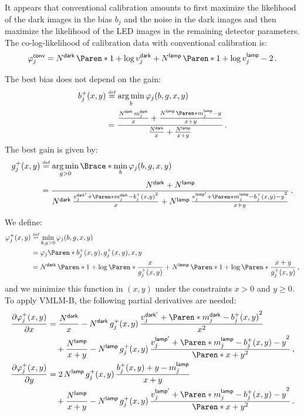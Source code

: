 \documentclass[a4paper,11pt,twoside]{scrartcl}
\DeclareMathOperator*{\argmin}{arg\,min}
\newcommand*{\Tag}[1]{\mathsf{#1}}
\newcommand*{\PDer}[2]{\frac{\partial#1}{\partial#2}}
\newcommand*{\bydef}{\stackrel{{\scriptscriptstyle \text{def}}}{=}}
\theoremstyle{plain} %
\theoremstyle{definition}
\theoremstyle{remark}
\begin{document}
It appears that conventional calibration amounts to first maximize the
likelihood of the dark images in the bias $b_j$ and the noise in the dark
images and then maximize the likelihood of the LED images in the remaining
detector parameters.  The co-log-likelihood of calibration data with
conventional calibration is:
\begin{align}
  \varphi^\Tag{conv}_j =
  N^\Tag{dark}\,\Paren*{1 + \log v^\Tag{dark}_j} +
  N^\Tag{lamp}\,\Paren*{1 + \log v^\Tag{lamp}_j} - 2 \, .
\end{align}

The best bias does not depend on the gain:
\begin{align}
  b^+_j(x,y)
  &\bydef \argmin_{b} \varphi_j(b,g,x,y) \notag\\
  &= \frac{
    \frac{N^\Tag{dark}\,m^\Tag{dark}_j}{x} +
    \frac{N^\Tag{lamp}\,\Paren*{m^\Tag{lamp}_j - y}}{x + y}
  }{
    \frac{N^\Tag{dark}}{x} +
    \frac{N^\Tag{lamp}}{x + y}
  } \, .
\end{align}
The best gain is given by:
\begin{align}
  g^+_j(x,y)
  &\bydef \argmin_{g > 0} \Brace*{\min_{b} \varphi_j(b,g,x,y)} \notag\\
  &= \frac{
    N^\Tag{dark} + N^\Tag{lamp}
  }{
    N^\Tag{dark}\,\frac{
      v^\Tag{dark'}_j + \Paren*{m^\Tag{dark}_j - b^+_j(x,y)}^2
    }{
      x
    } + N^\Tag{lamp}\,\frac{
      v^\Tag{lamp'}_j + \Paren*{m^\Tag{lamp}_j - b^+_j(x,y) - y}^2
    }{
      x + y
    }
  } \, .
\end{align}

We define:
\begin{align}
  \varphi^+_j(x, y)
  &\bydef \min_{b,g>0} \varphi_j(b,g,x,y) \notag \\
  &= \varphi_j\Paren*{b^+_j(x,y),g^+_j(x,y),x,y} \notag \\
  &= N^\Tag{dark}\,\Paren*{1 + \log\Paren*{\frac{x}{g_j^+(x,y)}}}
   + N^\Tag{lamp}\,\Paren*{1 + \log\Paren*{\frac{x + y}{g_j^+(x,y)}}} \, ,
\end{align}
and we minimize this function in $(x,y)$ under the constraints $x>0$ and $y≥0$.
To apply VMLM-B, the following partial derivatives are needed:
\begin{align}
  \PDer{\varphi^+_j(x, y)}{x}
  &= \frac{N^\Tag{dark}}{x} - N^\Tag{dark}\,g^ +_j(x,y)\,\frac{
      v^\Tag{dark'}_j + \Paren*{m^\Tag{dark}_j - b^+_j(x,y)}^2
    }{
      x^2
    } \notag\\
  &\quad + \frac{N^\Tag{lamp}}{x + y} - N^\Tag{lamp}\,g^+_j(x,y)\,\frac{
      v^\Tag{lamp'}_j + \Paren*{m^\Tag{lamp}_j - b^+_j(x,y) - y}^2
    }{
      \Paren*{x + y}^2
    }
    \, , \\
  \PDer{\varphi^+_j(x, y)}{y}
  &= 2\,N^\Tag{lamp}\,g^+_j(x,y)\,\frac{
       b^+_j(x,y) + y - m^\Tag{lamp}_j
    }{
      x + y
    } \notag\\
  &\quad + \frac{N^\Tag{lamp}}{x + y} - N^\Tag{lamp}\,g^+_j(x,y)\,\frac{
    v^\Tag{lamp'}_j + \Paren*{m^\Tag{lamp}_j - b^+_j(x,y) - y}^2
  }{
    \Paren*{x + y}^2
  }
  \, .
\end{align}
\end{document}
